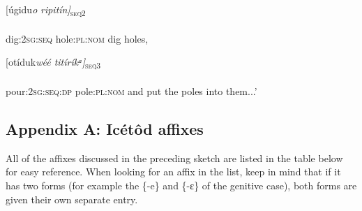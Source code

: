 \ea\label{ex:}
\gll [úgidu\textit{o}\textit{   ripitín]}\textsc{\textsubscript{seq2}} \\
    \\
dig:\textsc{2sg:seq}   hole:\textsc{pl:nom}
\glt dig holes,
\z  


\ea\label{ex:}
\gll [otíduk\textit{w}\textit{éé     titíríkᵃ]}\textsc{\textsubscript{seq3}} \\
    \\
pour:\textsc{2sg:seq:dp}   pole:\textsc{pl:nom}
\glt and put the poles into them...’
\z  

\subsection{Appendix A: Icétôd affixes}

All of the affixes discussed in the preceding sketch are listed in the table below for easy reference. When looking for an affix in the list, keep in mind that if it has two forms (for example the \{-e\} and \{-ɛ\} of the genitive case), both forms are given their own separate entry.

